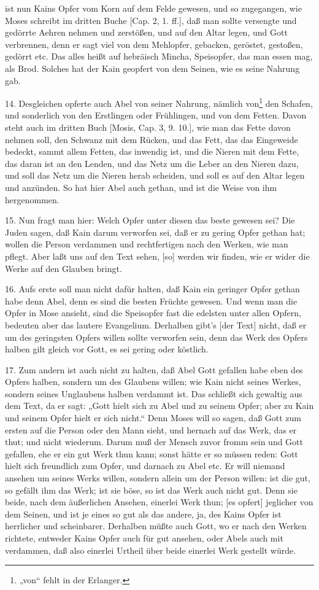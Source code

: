 ist nun Kains Opfer vom Korn auf dem Felde gewesen, und so zugegangen, wie Moses schreibt im dritten Buche [Cap. 2, 1. ff.], daß man sollte versengte und gedörrte Aehren nehmen und zerstößen, und auf den Altar legen, und Gott verbrennen, denn er sagt viel von dem Mehlopfer, gebacken, geröstet, gestoßen, gedörrt etc. Das alles heißt auf hebräisch Mincha, Speisopfer, das man essen mag, als Brod. Solches hat der Kain geopfert von dem Seinen, wie es seine Nahrung gab.

14. Desgleichen opferte auch Abel von seiner Nahrung, nämlich von\footnote{„von“ fehlt in der Erlanger.} den Schafen, und sonderlich von den Erstlingen oder Frühlingen, und von dem Fetten. Davon steht auch im dritten Buch [Mosis, Cap. 3, 9. 10.], wie man das Fette davon nehmen soll, den Schwanz mit dem Rücken, und das Fett, das das Eingeweide bedeckt, sammt allem Fetten, das inwendig ist, und die Nieren mit dem Fette, das daran ist an den Lenden, und das Netz um die Leber an den Nieren dazu, und soll das Netz um die Nieren herab scheiden, und soll es auf den Altar legen und anzünden. So hat hier Abel auch gethan, und ist die Weise von ihm hergenommen.

15. Nun fragt man hier: Welch Opfer unter diesen das beste gewesen sei? Die Juden sagen, daß Kain darum verworfen sei, daß er zu gering Opfer gethan hat; wollen die Person verdammen und rechtfertigen nach den Werken, wie man pflegt. Aber laßt uns auf den Text sehen, [so] werden wir finden, wie er wider die Werke auf den Glauben bringt.

16. Aufs erste soll man nicht dafür halten, daß Kain ein geringer Opfer gethan habe denn Abel, denn es sind die besten Früchte gewesen. Und wenn man die Opfer in Mose ansieht, sind die Speisopfer fast die edelsten unter allen Opfern, bedeuten aber das lautere Evangelium. Derhalben gibt’s [der Text] nicht, daß er um des geringsten Opfers willen sollte verworfen sein, denn das Werk des Opfers halben gilt gleich vor Gott, es sei gering oder köstlich.

17. Zum andern ist auch nicht zu halten, daß Abel Gott gefallen habe eben des Opfers halben, sondern um des Glaubens willen; wie Kain nicht seines Werkes, sondern seines Unglaubens halben verdammt ist. Das schließt sich gewaltig aus dem Text, da er sagt: „Gott hielt sich zu Abel und zu seinem Opfer; aber zu Kain und seinem Opfer hielt er sich nicht.“ Denn Moses will so sagen, daß Gott zum ersten auf die Person oder den Mann sieht, und hernach auf das Werk, das er thut; und nicht wiederum. Darum muß der Mensch zuvor fromm sein und Gott gefallen, ehe er ein gut Werk thun kann; sonst hätte er so müssen reden: Gott hielt sich freundlich zum Opfer, und darnach zu Abel etc. Er will niemand ansehen um seines Werks willen, sondern allein um der Person willen: ist die gut, so gefällt ihm das Werk; ist sie böse, so ist das Werk auch nicht gut. Denn sie beide, nach dem äußerlichen Ansehen, einerlei Werk thun; [es opfert] jeglicher von dem Seinen, und ist je eines so gut als das andere, ja, des Kains Opfer ist herrlicher und scheinbarer. Derhalben müßte auch Gott, wo er nach den Werken richtete, entweder Kains Opfer auch für gut ansehen, oder Abels auch mit verdammen, daß also einerlei Urtheil über beide einerlei Werk gestellt würde.

